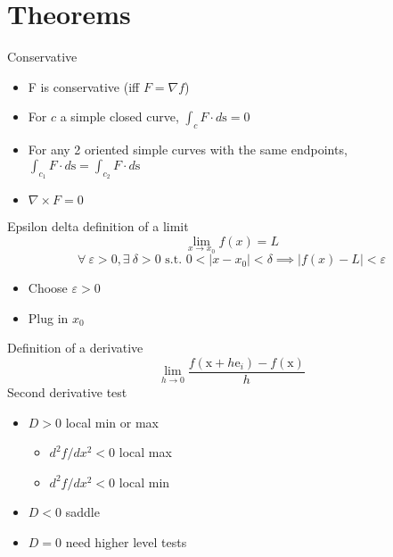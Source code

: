 \documentclass[8pt]{article}
\def\x{\textrm{x}}
\def\s{\textrm{s}}
\begin{document}
\section*{Theorems}
Conservative
\begin{itemize}
    \item F is conservative (iff $F=\nabla f$)
    \item For $c$ a simple closed curve, $\int_{c}F\cdot d\s = 0$
    \item For any 2 oriented simple curves with the same endpoints, $\int_{c_1} F\cdot d\s= \int_{c_2}F\cdot d\s$
    \item $\nabla \times F = 0$
\end{itemize}{}
Epsilon delta definition of a limit
$$\lim_{x\to x_0} f(x) = L$$
$$\forall~ \varepsilon > 0, \exists~ \delta > 0 \textrm{ s.t. } 0<|x - x_0|<\delta \implies |f(x)-L| < \varepsilon$$
\begin{itemize}
    \item Choose $\varepsilon > 0$
    \item Plug in $x_0$
\end{itemize}{}
Definition of a derivative
$$\lim_{h\to 0}\frac{f(\x + h \textrm{e}_i) - f(\x)}{h}$$
Second derivative test
\begin{itemize}
    \item $D > 0$ local min or max
    \begin{itemize}
        \item $d^2f/dx^2 < 0$ local max
        \item $d^2f/dx^2 < 0$ local min
    \end{itemize}
    \item $D < 0$ saddle
    \item $D = 0$ need higher level tests
\end{itemize}
\end{document}
